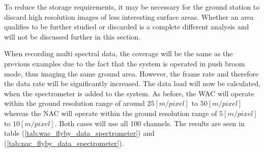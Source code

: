 To reduce the storage requirements, it may be necessary for the ground station to discard high resolution images of less interesting surface areas. Whether an area qualifies to be further studied or discarded is a complete different analysis and will not be discussed further in this section.

When recording multi spectral data, the coverage will be the same as the previous examples due to the fact that the system is operated in push broom mode, thus imaging the same ground area. However, the frame rate and therefore the data rate will be significantly increased. The data load will now be calculated, when the spectrometer is added to the system. As before, the WAC will operate within the ground resolution range of around $25[m/pixel]$ to $50[m/pixel]$ whereas the NAC will operate within the ground resolution range of $5[m/pixel]$ to $10[m/pixel]$. Both cases will use all 100 channels. The results are seen in table (\ref{tab:wac_flyby_data_spectrometer}) and (\ref{tab:nac_flyby_data_spectrometer}).
\begin{table}[htb!]
  \centering
  \caption{The total data generated by the WAC with the spectrometer enabled, during a flyby}
  \label{tab:wac_flyby_data_spectrometer}%
\end{table}%
